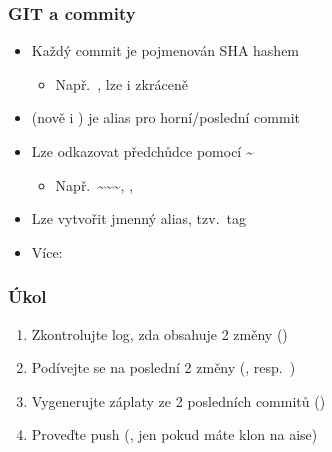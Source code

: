 \begin{frame}
  \frametitle{GIT a commity}

  \begin{itemize}
    \item Každý commit je pojmenován SHA hashem
    \begin{itemize}
      \item Např.\ , lze i
	zkráceně 
    \end{itemize}

    \pause

    \item {} (nově i ) je alias pro horní/poslední commit

    \pause

    \item Lze odkazovat předchůdce pomocí \textasciitilde
    \begin{itemize}
      \item Např.\ \textasciitilde\textasciitilde\textasciitilde,
	, 
    \end{itemize}

    \pause

    \item Lze vytvořit jmenný alias, tzv.\ tag

    \pause

    \item Více: 

  \end{itemize}

\end{frame}

\begin{frame}
  \frametitle{Úkol}

  \begin{enumerate}
    \item Zkontrolujte log, zda obsahuje 2 změny ()
    \item Podívejte se na poslední 2 změny (,
      resp.\ )

    \pause

    \item Vygenerujte záplaty ze 2 posledních commitů ()

    \iffimuni
      \pause

      \item Proveďte push (, jen pokud máte klon na aise)
    \fi

  \end{enumerate}

   \fi

\end{frame}

